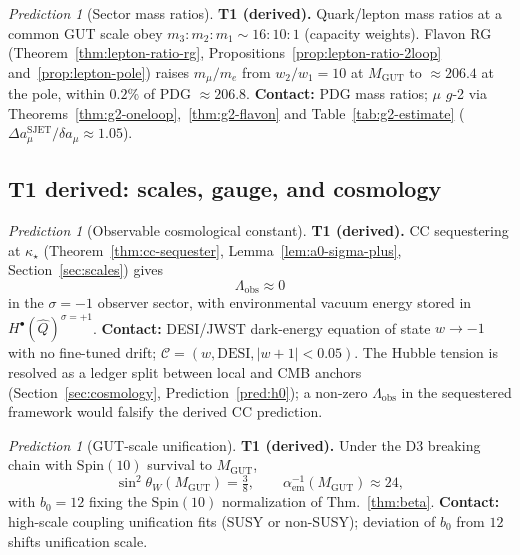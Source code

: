 \documentclass[aps,prd,onecolumn,amsmath,amssymb,nofootinbib,11pt]{revtex4-2}
\numberwithin{equation}{section}
\theoremstyle{plain}
\theoremstyle{definition}
\theoremstyle{remark}
\newtheorem{prediction}[theorem]{Prediction}
\newcommand{\Spin}{\mathrm{Spin}}
\begin{document}
\begin{prediction}[Sector mass ratios]\label{pred:sector-ratios}
\textbf{T1 (derived).} Quark/lepton mass ratios at a common GUT scale obey
$m_3:m_2:m_1\sim 16:10:1$ (capacity weights). Flavon RG
(Theorem~\ref{thm:lepton-ratio-rg}, Propositions~\ref{prop:lepton-ratio-2loop}
and~\ref{prop:lepton-pole}) raises $m_\mu/m_e$ from $w_2/w_1=10$ at
$M_{\mathrm{GUT}}$ to $\approx206.4$ at the pole, within $0.2\%$ of PDG
$\approx206.8$.
\textbf{Contact:} PDG mass ratios; $\mu$ $g$-2 via
Theorems~\ref{thm:g2-oneloop},~\ref{thm:g2-flavon} and
Table~\ref{tab:g2-estimate} ($\Delta a_\mu^{\mathrm{SJET}}/\delta a_\mu\approx1.05$).
\end{prediction}

\subsection{T1 derived: scales, gauge, and cosmology}
\label{sec:predictions:T1-derived-scales}

\begin{prediction}[Observable cosmological constant]\label{pred:cc}
\textbf{T1 (derived).} CC sequestering at $\kappa_\star$
(Theorem~\ref{thm:cc-sequester}, Lemma~\ref{lem:a0-sigma-plus},
Section~\ref{sec:scales}) gives
\begin{equation}\label{eq:Lambda-obs}
  \Lambda_{\mathrm{obs}}\approx 0
\end{equation}
in the $\sigma=-1$ observer sector, with environmental vacuum energy stored in
$H^\bullet(\hat Q)^{\sigma=+1}$.
\textbf{Contact:} DESI/JWST dark-energy equation of state
$w\to -1$ with no fine-tuned drift; $\mathcal{C}=(w,\mathrm{DESI},|w+1|<0.05)$.
The Hubble tension is resolved as a ledger split between local and CMB
anchors (Section~\ref{sec:cosmology}, Prediction~\ref{pred:h0}); a non-zero
$\Lambda_{\mathrm{obs}}$ in the sequestered framework would falsify the
derived CC prediction.
\end{prediction}

\begin{prediction}[GUT-scale unification]\label{pred:gut}
\textbf{T1 (derived).} Under the D3 breaking chain with $\Spin(10)$ survival
to $M_{\mathrm{GUT}}$,
\begin{equation}\label{eq:sin2w}
  \sin^2\theta_W(M_{\mathrm{GUT}})=\tfrac38,
  \qquad
  \alpha_{\mathrm{em}}^{-1}(M_{\mathrm{GUT}})\approx 24,
\end{equation}
with $b_0=12$ fixing the $\Spin(10)$ normalization of Thm.~\ref{thm:beta}.
\textbf{Contact:} high-scale coupling unification fits (SUSY or non-SUSY);
deviation of $b_0$ from $12$ shifts unification scale.
\end{prediction}
\end{document}
